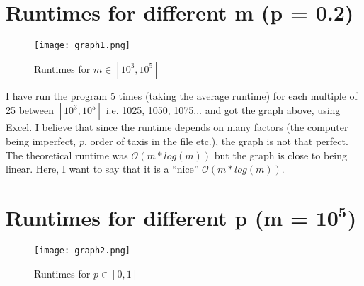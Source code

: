 \documentclass[12pt, a4paper]{article}
\begin{document}
\section{Runtimes for different \textbf{m} \textbf{(p = 0.2)}}
\begin{figure}[H]
    \centering
    \texttt{[image: graph1.png]}
    \caption{Runtimes for $m \in [10^3, 10^5]$}
    \label{fig:graph1}
\end{figure}
I have run the program 5 times (taking the average runtime) for each multiple of 25 between $[10^3, 10^5]$ i.e. 1025, 1050, 1075... and got the graph above, using Excel. I believe that since the runtime depends on many factors (the computer being imperfect, $p$, order of taxis in the file etc.), the graph is not that perfect. The theoretical runtime was $\mathcal{O}(m*log(m))$ but the graph is close to being linear. Here, I want to say that it is a \enquote{nice} $\mathcal{O}(m*log(m))$.
\newpage
\section{Runtimes for different \textbf{p} \textbf{(m = $\mathbf{10^5}$)}}
\begin{figure}[H]
    \centering
    \texttt{[image: graph2.png]}
    \caption{Runtimes for $p \in [0, 1]$}
    \label{fig:graph2}
\end{figure}
\end{document}
